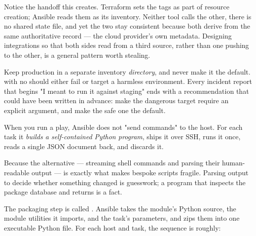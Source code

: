 \begin{infranote}
Notice the handoff this creates. Terraform sets the tags as part of resource creation; Ansible reads them as its inventory. Neither tool calls the other, there is no shared state file, and yet the two stay consistent because both derive from the same authoritative record --- the cloud provider's own metadata. Designing integrations so that both sides read from a third source, rather than one pushing to the other, is a general pattern worth stealing.
\end{infranote}

\begin{secwarn}
Keep production in a separate inventory \emph{directory}, and never make it the default.  with no  should either fail or target a harmless environment. Every incident report that begins "I meant to run it against staging" ends with a recommendation that could have been written in advance: make the dangerous target require an explicit argument, and make the safe one the default.
\end{secwarn}


 When you run a play, Ansible does not "send commands" to the host. For each task it \emph{builds a self-contained Python program}, ships it over SSH, runs it once, reads a single JSON document back, and discards it.

 Because the alternative --- streaming shell commands and parsing their human-readable output --- is exactly what makes bespoke scripts fragile. Parsing  output to decide whether something changed is guesswork; a program that inspects the package database and returns  is a fact.

 The packaging step is called . Ansible takes the module's Python source, the module utilities it imports, and the task's parameters, and zips them into one executable Python file. For each host and task, the sequence is roughly:

